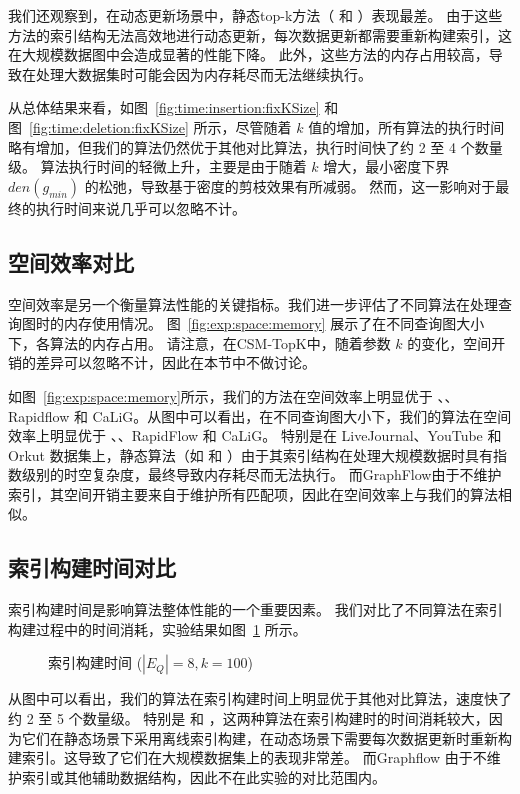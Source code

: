 我们还观察到，在动态更新场景中，静态top-k方法（ \itk 和 \pm）表现最差。
由于这些方法的索引结构无法高效地进行动态更新，每次数据更新都需要重新构建索引，这在大规模数据图中会造成显著的性能下降。
此外，这些方法的内存占用较高，导致在处理大数据集时可能会因为内存耗尽而无法继续执行。


从总体结果来看，如图~\ref{fig:time:insertion:fixKSize} 和图~\ref{fig:time:deletion:fixKSize} 所示，尽管随着 $k$ 值的增加，所有算法的执行时间略有增加，但我们的算法仍然优于其他对比算法，执行时间快了约 2 至 4 个数量级。
算法执行时间的轻微上升，主要是由于随着 $k$ 增大，最小密度下界 $den(g_{min})$ 的松弛，导致基于密度的剪枝效果有所减弱。
然而，这一影响对于最终的执行时间来说几乎可以忽略不计。


\subsection{空间效率对比}
\label{ch5:space}

空间效率是另一个衡量算法性能的关键指标。我们进一步评估了不同算法在处理查询图时的内存使用情况。
图~\ref{fig:exp:space:memory} 展示了在不同查询图大小下，各算法的内存占用。
请注意，在CSM-TopK中，随着参数 $k$ 的变化，空间开销的差异可以忽略不计，因此在本节中不做讨论。

如图~\ref{fig:exp:space:memory}所示，我们的方法在空间效率上明显优于 \itk、\pm、Rapidflow 和 CaLiG。从图中可以看出，在不同查询图大小下，我们的算法在空间效率上明显优于 \itk、\pm、RapidFlow 和 CaLiG。
特别是在 LiveJournal、YouTube 和 Orkut 数据集上，静态算法（如 \itk 和 \pm）由于其索引结构在处理大规模数据时具有指数级别的时空复杂度，最终导致内存耗尽而无法执行。
而GraphFlow由于不维护索引，其空间开销主要来自于维护所有匹配项，因此在空间效率上与我们的算法相似。


\subsection{索引构建时间对比}
\label{ch5:index-construction}
索引构建时间是影响算法整体性能的一个重要因素。
我们对比了不同算法在索引构建过程中的时间消耗，实验结果如图~\ref{fig:exp:time:index} 所示。   
\begin{figure}[h!]
    \centering
    \caption{索引构建时间  ($|E_Q|=8, k=100$)}
    \label{fig:exp:time:index}
\end{figure} 


从图中可以看出，我们的算法在索引构建时间上明显优于其他对比算法，速度快了约 2 至 5 个数量级。
特别是 \itk 和 \pm，这两种算法在索引构建时的时间消耗较大，因为它们在静态场景下采用离线索引构建，在动态场景下需要每次数据更新时重新构建索引。这导致了它们在大规模数据集上的表现非常差。
而Graphflow 由于不维护索引或其他辅助数据结构，因此不在此实验的对比范围内。

